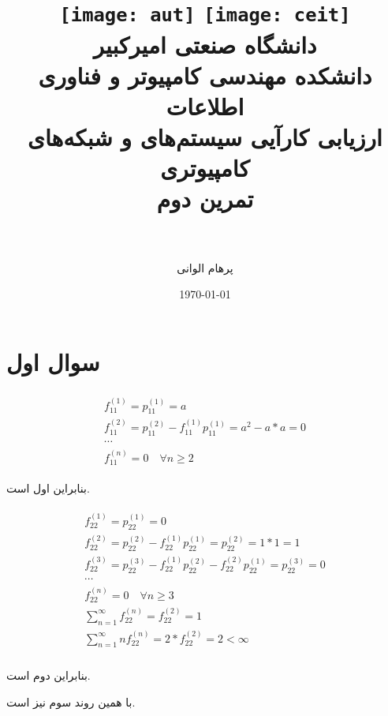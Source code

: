 \documentclass[paper=a4, fontsize=11pt]{article}
\title{
\normalfont\normalsize
\texttt{[image: aut]}
\hspace{5cm}
\texttt{[image: ceit]} \\
\textsc دانشگاه صنعتی امیرکبیر \\
\textsc دانشکده مهندسی کامپیوتر و فناوری اطلاعات
\horrule{0.5pt} \\ [0.4cm] %
\huge ارزیابی کارآیی سیستم‌های و شبکه‌های کامپیوتری \\ %
\huge تمرین دوم \\ %
\horrule{2pt} \\ [0.5cm] %
}
\author{پرهام الوانی}
\date{\normalsize\today} %
\numberwithin{equation}{section} %
\numberwithin{figure}{section} %
\numberwithin{table}{section} %
\begin{document}
\maketitle %

\section{سوال اول}

\begin{align}
\begin{split}
    f^{(1)}_{11} = p^{(1)}_{11} = a \\
    f^{(2)}_{11} = p^{(2)}_{11} - f^{(1)}_{11}p^{(1)}_{11} = a^2 - a * a = 0 \\
    \cdots\\
    f_{11}^{(n)} = 0 \quad \forall n \ge 2
\end{split}
\end{align}

بنابراین
اول  است. 

\begin{align}
\begin{split}
    f^{(1)}_{22} = p^{(1)}_{22} = 0 \\
    f^{(2)}_{22} = p^{(2)}_{22} - f^{(1)}_{22}p^{(1)}_{22} = p^{(2)}_{22} = 1 * 1 = 1 \\
    f^{(3)}_{22} = p^{(3)}_{22} - f^{(1)}_{22}p^{(2)}_{22} - f^{(2)}_{22}p^{(1)}_{22} = p^{(3)}_{22} = 0 \\
    \cdots \\
    f_{22}^{(n)} = 0 \quad \forall n \ge 3 \\
    \sum_{n=1}^{\infty} f_{22}^{(n)} = f_{22}^{(2)} = 1 \\
    \sum_{n=1}^{\infty} nf_{22}^{(n)} = 2 * f_{22}^{(2)} = 2 < \infty \\
\end{split}
\end{align}

بنابراین
دوم  است.

با همین روند  سوم نیز
 است.
\end{document}

